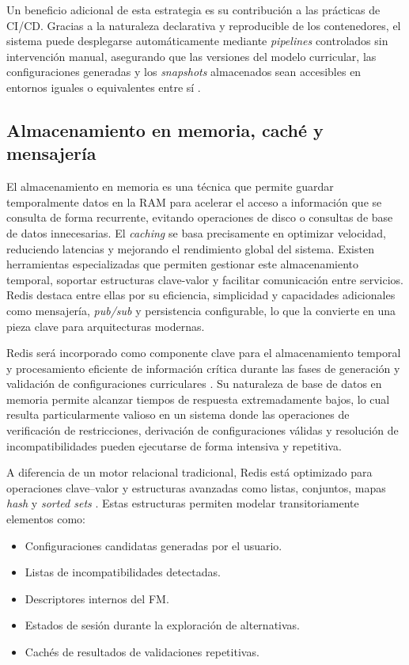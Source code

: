 Un beneficio adicional de esta estrategia es su contribución a las prácticas de 
\ac{CI/CD}. Gracias a la naturaleza 
declarativa y reproducible de los contenedores, el sistema puede desplegarse 
automáticamente mediante \textit{pipelines} controlados sin intervención manual, asegurando 
que las versiones del modelo curricular, las configuraciones generadas y los 
\textit{snapshots} almacenados sean accesibles en entornos iguales o equivalentes entre sí 
\citep{docker2024docs}.

\subsection{Almacenamiento en memoria, caché y mensajería}

El almacenamiento en memoria es una técnica que permite guardar temporalmente datos en la
\ac{RAM} para acelerar el acceso a información que se consulta de forma recurrente, 
evitando operaciones de disco o consultas de base de datos innecesarias. El \textit{caching} se 
basa precisamente en optimizar velocidad, reduciendo latencias y mejorando el rendimiento 
global del sistema. Existen herramientas especializadas que permiten gestionar este 
almacenamiento temporal, soportar estructuras clave-valor y facilitar comunicación 
entre servicios. Redis destaca entre ellas por su eficiencia, simplicidad y capacidades 
adicionales como mensajería, \textit{pub/sub} y persistencia configurable, lo que la convierte 
en una pieza clave para arquitecturas modernas.

Redis será incorporado como componente clave para el almacenamiento temporal 
y procesamiento eficiente de información crítica durante las fases de 
generación y validación de configuraciones curriculares \citep{carlson2013redis}. Su naturaleza de 
base de datos en memoria permite alcanzar tiempos de respuesta extremadamente 
bajos, lo cual resulta particularmente valioso en un sistema donde las 
operaciones de verificación de restricciones, derivación de configuraciones 
válidas y resolución de incompatibilidades pueden ejecutarse de forma intensiva 
y repetitiva.

A diferencia de un motor relacional tradicional, Redis está optimizado 
para operaciones clave–valor y estructuras avanzadas como listas, conjuntos, 
mapas \textit{hash} y \textit{sorted sets} \citep{carlson2013redis}. Estas estructuras permiten modelar transitoriamente 
elementos como:
\begin{itemize}
    \item Configuraciones candidatas generadas por el usuario.
    \item Listas de incompatibilidades detectadas.
    \item Descriptores internos del \ac{FM}.
    \item Estados de sesión durante la exploración de alternativas.
    \item Cachés de resultados de validaciones repetitivas.
\end{itemize}

